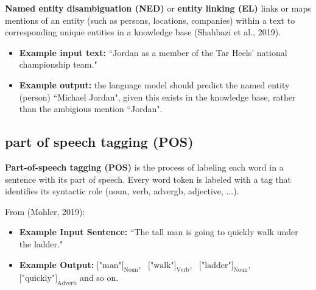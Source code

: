 \textbf{Named entity disambiguation (NED)} or \textbf{entity linking (EL)} links or maps mentions of an entity (such as persons, locations, companies) within a text to corresponding unique entities in a knowledge base (Shahbazi et al., 2019). 

\begin{itemize}
    \item \textbf{Example input text: } ``Jordan as a  member of the Tar Heels' national championship team."
    
    \item \textbf{Example output: } the language model should predict the named entity (person) ``Michael Jordan", given this exists in the knowledge base, rather than the ambigious mention ``Jordan". 
\end{itemize}





\subsection{part of speech tagging (POS)} \label{nlptask:postagging}

\textbf{Part-of-speech tagging (POS)} is the process of labeling each word in a sentence with its part of speech. Every word token is labeled with a tag that identifies its syntactic role (noun, verb, advergb, adjective, ...).  

From (Mohler, 2019): 

\begin{itemize}
    \item \textbf{Example Input Sentence: } ``The tall man is going to quickly walk under the ladder."
    
    \item \textbf{Example Output: } $\Big[ \text{"man"}\Big]_\text{Noun}$, \ $\Big[ \text{"walk"}\Big]_\text{Verb}$, \ $\Big[ \text{"ladder"}\Big]_\text{Noun}$, \ $\Big[ \text{"quickly"}\Big]_\text{Adverb}$ and so on. 
\end{itemize}




